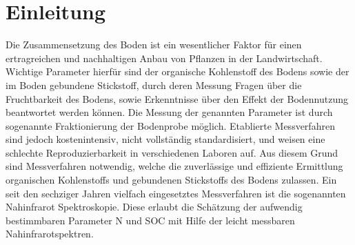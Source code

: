 \section{Einleitung}
\label{sec:Einleitung}

    Die Zusammensetzung des Boden ist ein wesentlicher Faktor für einen ertragreichen und nachhaltigen Anbau von Pflanzen in der Landwirtschaft.
    Wichtige Parameter hierfür sind der organische Kohlenstoff des Bodens sowie der im Boden gebundene Stickstoff, durch deren Messung Fragen über die Fruchtbarkeit des Bodens, sowie Erkenntnisse über den Effekt der Bodennutzung beantwortet werden können.\cite{Poeplau2013}
    Die Messung der genannten Parameter ist durch sogenannte Fraktionierung der Bodenprobe möglich.
    Etablierte Messverfahren sind jedoch kostenintensiv, nicht vollständig standardisiert, und weisen eine schlechte Reproduzierbarkeit in verschiedenen Laboren auf.\cite{Poeplau2013}
    Aus diesem Grund sind Messverfahren notwendig, welche die zuverlässige und effiziente Ermittlung organischen Kohlenstoffs und gebundenen Stickstoffs des Bodens zulassen.
    Ein seit den sechziger Jahren vielfach eingesetztes Messverfahren ist die sogenannten Nahinfrarot Spektroskopie. \cite{Agelet2010}
    Diese erlaubt die Schätzung der aufwendig bestimmbaren Parameter N und SOC mit Hilfe der leicht messbaren Nahinfrarotspektren.

	
